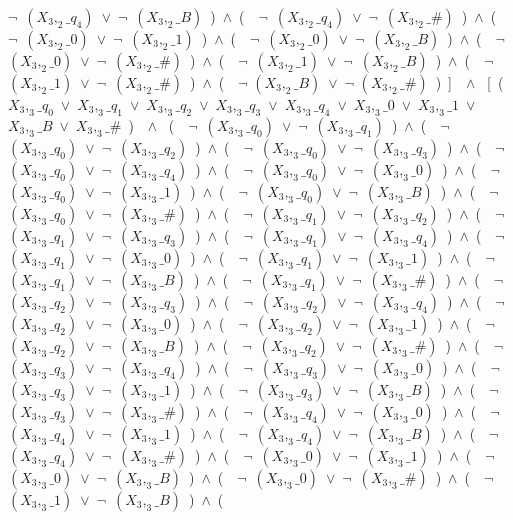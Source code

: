 ﻿\documentclass[a4paper,10pt]{article}
\begin{document}
$\neg$\ $(X_3,_2\_q_4)$\ $\vee$\ $\neg$\ $(X_3,_2\_B)$\ )\ $\wedge$\ (\ \ $\neg$\ $(X_3,_2\_q_4)$\ $\vee$\ $\neg$\ $(X_3,_2\_\#)$\ )\ $\wedge$\ (\ \ $\neg$\ $(X_3,_2\_0)$\ $\vee$\ $\neg$\ $(X_3,_2\_1)$\ )\ $\wedge$\ (\ \ $\neg$\ $(X_3,_2\_0)$\ $\vee$\ $\neg$\ $(X_3,_2\_B)$\ )\ $\wedge$\ (\ \ $\neg$\ $(X_3,_2\_0)$\ $\vee$\ $\neg$\ $(X_3,_2\_\#)$\ )\ $\wedge$\ (\ \ $\neg$\ $(X_3,_2\_1)$\ $\vee$\ $\neg$\ $(X_3,_2\_B)$\ )\ $\wedge$\ (\ \ $\neg$\ $(X_3,_2\_1)$\ $\vee$\ $\neg$\ $(X_3,_2\_\#)$\ )\ $\wedge$\ (\ \ $\neg$ $(X_3,_2\_B)$\ $\vee$\ $\neg$ $(X_3,_2\_\#)$\ )\ ]\ \ $\wedge$ \ [\ (\ $X_3,_3\_q_0$\ $\vee$\ $X_3,_3\_q_1$\ $\vee$\ $X_3,_3\_q_2$\ $\vee$\ $X_3,_3\_q_3$\ $\vee$\ $X_3,_3\_q_4$\ $\vee$\ $X_3,_3\_0$\ $\vee$\ $X_3,_3\_1$\ $\vee$\ $X_3,_3\_B$\ $\vee$\ $X_3,_3\_\#$\ )\ \ $\wedge$ \ (\ \ $\neg$\ $(X_3,_3\_q_0)$\ $\vee$\ $\neg$\ $(X_3,_3\_q_1)$\ )\ $\wedge$\ (\ \ $\neg$\ $(X_3,_3\_q_0)$\ $\vee$\ $\neg$\ $(X_3,_3\_q_2)$\ )\ $\wedge$\ (\ \ $\neg$\ $(X_3,_3\_q_0)$\ $\vee$\ $\neg$\ $(X_3,_3\_q_3)$\ )\ $\wedge$\ (\ \ $\neg$\ $(X_3,_3\_q_0)$\ $\vee$\ $\neg$\ $(X_3,_3\_q_4)$\ )\ $\wedge$\ (\ \ $\neg$\ $(X_3,_3\_q_0)$\ $\vee$\ $\neg$\ $(X_3,_3\_0)$\ )\ $\wedge$\ (\ \ $\neg$\ $(X_3,_3\_q_0)$\ $\vee$\ $\neg$\ $(X_3,_3\_1)$\ )\ $\wedge$\ (\ \ $\neg$\ $(X_3,_3\_q_0)$\ $\vee$\ $\neg$\ $(X_3,_3\_B)$\ )\ $\wedge$\ (\ \ $\neg$\ $(X_3,_3\_q_0)$\ $\vee$\ $\neg$\ $(X_3,_3\_\#)$\ )\ $\wedge$\ (\ \ $\neg$\ $(X_3,_3\_q_1)$\ $\vee$\ $\neg$\ $(X_3,_3\_q_2)$\ )\ $\wedge$\ (\ \ $\neg$\ $(X_3,_3\_q_1)$\ $\vee$\ $\neg$\ $(X_3,_3\_q_3)$\ )\ $\wedge$\ (\ \ $\neg$\ $(X_3,_3\_q_1)$\ $\vee$\ $\neg$\ $(X_3,_3\_q_4)$\ )\ $\wedge$\ (\ \ $\neg$\ $(X_3,_3\_q_1)$\ $\vee$\ $\neg$\ $(X_3,_3\_0)$\ )\ $\wedge$\ (\ \ $\neg$\ $(X_3,_3\_q_1)$\ $\vee$\ $\neg$\ $(X_3,_3\_1)$\ )\ $\wedge$\ (\ \ $\neg$\ $(X_3,_3\_q_1)$\ $\vee$\ $\neg$\ $(X_3,_3\_B)$\ )\ $\wedge$\ (\ \ $\neg$\ $(X_3,_3\_q_1)$\ $\vee$\ $\neg$\ $(X_3,_3\_\#)$\ )\ $\wedge$\ (\ \ $\neg$\ $(X_3,_3\_q_2)$\ $\vee$\ $\neg$\ $(X_3,_3\_q_3)$\ )\ $\wedge$\ (\ \ $\neg$\ $(X_3,_3\_q_2)$\ $\vee$\ $\neg$\ $(X_3,_3\_q_4)$\ )\ $\wedge$\ (\ \ $\neg$\ $(X_3,_3\_q_2)$\ $\vee$\ $\neg$\ $(X_3,_3\_0)$\ )\ $\wedge$\ (\ \ $\neg$\ $(X_3,_3\_q_2)$\ $\vee$\ $\neg$\ $(X_3,_3\_1)$\ )\ $\wedge$\ (\ \ $\neg$\ $(X_3,_3\_q_2)$\ $\vee$\ $\neg$\ $(X_3,_3\_B)$\ )\ $\wedge$\ (\ \ $\neg$\ $(X_3,_3\_q_2)$\ $\vee$\ $\neg$\ $(X_3,_3\_\#)$\ )\ $\wedge$\ (\ \ $\neg$\ $(X_3,_3\_q_3)$\ $\vee$\ $\neg$\ $(X_3,_3\_q_4)$\ )\ $\wedge$\ (\ \ $\neg$\ $(X_3,_3\_q_3)$\ $\vee$\ $\neg$\ $(X_3,_3\_0)$\ )\ $\wedge$\ (\ \ $\neg$\ $(X_3,_3\_q_3)$\ $\vee$\ $\neg$\ $(X_3,_3\_1)$\ )\ $\wedge$\ (\ \ $\neg$\ $(X_3,_3\_q_3)$\ $\vee$\ $\neg$\ $(X_3,_3\_B)$\ )\ $\wedge$\ (\ \ $\neg$\ $(X_3,_3\_q_3)$\ $\vee$\ $\neg$\ $(X_3,_3\_\#)$\ )\ $\wedge$\ (\ \ $\neg$\ $(X_3,_3\_q_4)$\ $\vee$\ $\neg$\ $(X_3,_3\_0)$\ )\ $\wedge$\ (\ \ $\neg$\ $(X_3,_3\_q_4)$\ $\vee$\ $\neg$\ $(X_3,_3\_1)$\ )\ $\wedge$\ (\ \ $\neg$\ $(X_3,_3\_q_4)$\ $\vee$\ $\neg$\ $(X_3,_3\_B)$\ )\ $\wedge$\ (\ \ $\neg$\ $(X_3,_3\_q_4)$\ $\vee$\ $\neg$\ $(X_3,_3\_\#)$\ )\ $\wedge$\ (\ \ $\neg$\ $(X_3,_3\_0)$\ $\vee$\ $\neg$\ $(X_3,_3\_1)$\ )\ $\wedge$\ (\ \ $\neg$\ $(X_3,_3\_0)$\ $\vee$\ $\neg$\ $(X_3,_3\_B)$\ )\ $\wedge$\ (\ \ $\neg$\ $(X_3,_3\_0)$\ $\vee$\ $\neg$\ $(X_3,_3\_\#)$\ )\ $\wedge$\ (\ \ $\neg$\ $(X_3,_3\_1)$\ $\vee$\ $\neg$\ $(X_3,_3\_B)$\ )\ $\wedge$\ (\ \ 
\end{document}
